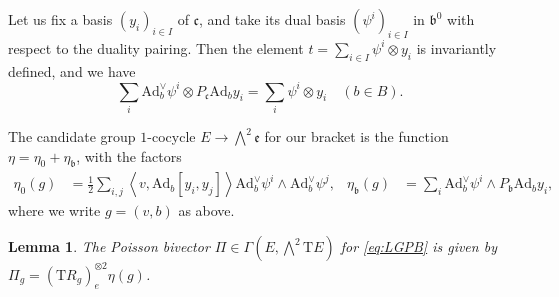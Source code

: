 \documentclass[a4paper,11pt]{amsart}
\newcommand{\fr}[1]{\mathfrak{#1}}
\newcommand{\rT}{\mathrm T}
\newcommand{\ox}{\otimes}
\newcommand{\Ad}{\mathrm{Ad}}
\newcommand{\largewedge}{\bigwedge}
\newtheorem{lem}[thm]{Lemma}
\theoremstyle{definition}
\theoremstyle{remark}
\begin{document}
Let us fix a basis $(y_i)_{i \in I}$ of $\fr{c}$, and take its dual basis $(\psi^i)_{i \in I}$ in $\fr{b}^0$ with respect to the duality pairing.
Then the element $t = \sum_{i \in I} \psi^i \otimes y_i$ is invariantly defined, and we have
\begin{equation}
\label{eq:psi-i-y-i-invariance}
\sum_i \Ad^\vee_b \psi^i \ox P_{\fr{c}}\Ad_b y_i = \sum_i \psi^i \ox y_i \quad (b \in B).
\end{equation}

The candidate group $1$-cocycle $E \to \largewedge^2 \fr{e}$ for our bracket is the function $\eta = \eta_0 + \eta_{\fr{b}}$, with the factors
\begin{align*}
\eta_0(g) &= \frac{1}{2} \sum_{i, j} \left\langle v , \Ad_b [ y_i , y_j ] \right\rangle \Ad^\vee_b \psi^i \wedge \Ad^\vee_b \psi^j,&
\eta_{\fr{b}}(g) &= \sum_i \Ad^\vee_b \psi^i \wedge P_{\fr{b}} \Ad_b y_i,
\end{align*}
where we write $g = (v, b)$ as above.

\begin{lem}
\label{lem:Pi-corresp-to-eta}
The Poisson bivector $\Pi \in \Gamma(E, \largewedge^2 \rT E)$ for \eqref{eq:LGPB} is given by $\Pi_g = (\rT R_g)_e^{\ox 2} \eta(g)$.
\end{lem}
\end{document}

